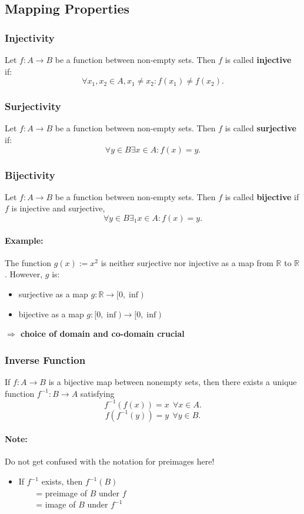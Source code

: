 \documentclass[twocolumn]{article}
\begin{document}
	\subsection{Mapping Properties}
		\subsubsection{Injectivity}
			Let $f:A\to B$ be a function between non-empty sets. 
			Then $f$ is called \textbf{injective} if:
			\[
			\forall x_1,x_2\in A,x_1 \not=x_2:f(x_1)\not=f(x_2)
			.\] 
		\subsubsection{Surjectivity}
			Let $f:A\to B$ be a function between non-empty sets. 
			Then $f$ is called \textbf{surjective} if:
			\[
			\forall y\in B\exists x\in A:f(x)=y
			.\] 
		\subsubsection{Bijectivity}
			Let $f:A\to B$ be a function between non-empty sets. 
			Then $f$ is called \textbf{bijective} if $f$ is injective and
			surjective,
			\[
			\forall y\in B\exists_1x\in A:f(x)=y
			.\] 
	
			\paragraph{Example:}
				The function $g(x):=x^2$ is neither surjective nor injective
				as a map from $\mathbb R $ to $\mathbb R $. However, $g$ is:
				\begin{itemize}%
				\renewcommand{\labelitemi}{$\rightarrow$}
				\item surjective as a map $g:\mathbb R \to[0,\inf)$
				\item bijective as a map $g:[0,\inf)\to[0,\inf)$ 
				\end{itemize}
				\textbf{$\Rightarrow$ choice of domain and co-domain crucial}
		\subsubsection{Inverse Function}
			If $f:A\to B$ is a bijective map between nonempty sets, then there exists a unique function
			$f^{-1}:B\to A$ satisfying
			\[
			f^{-1}(f(x))=x~~\forall x\in A
			.\] 
			\[
			f(f^{-1}(y))=y~~\forall y\in B
			.\] 
			
			\paragraph{Note:}
				Do not get confused with the notation for preimages here!
				\begin{itemize}%
				\renewcommand{\labelitemi}{$\Rightarrow$}
				\item If $f^{-1}$ exists, then $f^{-1}(B)$
					\\$~~~~~~~~$ = preimage of $B$ under $f$
					\\$~~~~~~~~$ = image of $B$ under $f^{-1}$ 
				\end{itemize}
\end{document}
